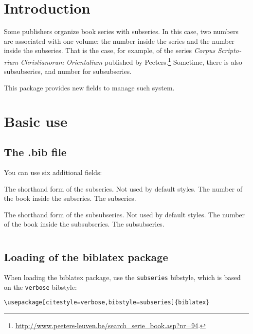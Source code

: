 \documentclass{ltxdockit}[2011/03/25]
\newcommand{\biblatex}{biblatex\xspace}
\newcommand{\namebibstyle}[1]{\texttt{#1}}
\begin{document}
\printtitlepage
\tableofcontents
\section{Introduction}

Some publishers organize book series with subseries. In this case, two numbers are associated with one volume: the number inside the series and the number inside the subseries. That is the case, for example, of the series \emph{\foreignlanguage{latin}{Corpus Scriptorium Christianorum Orientalium}} published by Peeters.\footnote{\url{http://www.peeters-leuven.be/search_serie_book.asp?nr=94}.}
Sometime, there is also subsubseries, and number for subsubseries.

This package provides new fields to manage such system.
\section{Basic use}

\subsection{The .bib file}
You can use six additional fields:
\begin{fieldlist}

 The shorthand form of the subseries. Not used by default styles.
 The number of the book inside the subseries.
 The subseries.

 The shorthand form of the subsubseries. Not used by default styles.
 The number of the book inside the subsubseries.
 The subsubseries.

\end{fieldlist}


\inputminted{tex}{biblatex-subseries-example.bib}


\subsection{Loading of the \biblatex package}

When loading the \biblatex package, use the \namebibstyle{subseries}  bibstyle, which is based on the \namebibstyle{verbose} bibstyle:

\begin{verbatim}
\usepackage[citestyle=verbose,bibstyle=subseries]{biblatex}
\end{verbatim}
\end{document}
